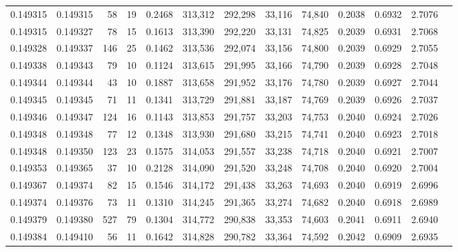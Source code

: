 \begin{tabular}{rrrrrrrrrrrrr}
0.149315 & 0.149315 &    58 &  19 &                                     0.2468 & 313,312 & 292,298 &  33,116 &  74,840 & 0.2038 & 0.6932 & 2.7076 \\
0.149315 & 0.149327 &    78 &  15 &                                     0.1613 & 313,390 & 292,220 &  33,131 &  74,825 & 0.2039 & 0.6931 & 2.7068 \\
0.149328 & 0.149337 &   146 &  25 &                                     0.1462 & 313,536 & 292,074 &  33,156 &  74,800 & 0.2039 & 0.6929 & 2.7055 \\
0.149338 & 0.149343 &    79 &  10 &                                     0.1124 & 313,615 & 291,995 &  33,166 &  74,790 & 0.2039 & 0.6928 & 2.7048 \\
0.149344 & 0.149344 &    43 &  10 &                                     0.1887 & 313,658 & 291,952 &  33,176 &  74,780 & 0.2039 & 0.6927 & 2.7044 \\
0.149345 & 0.149345 &    71 &  11 &                                     0.1341 & 313,729 & 291,881 &  33,187 &  74,769 & 0.2039 & 0.6926 & 2.7037 \\
0.149346 & 0.149347 &   124 &  16 &                                     0.1143 & 313,853 & 291,757 &  33,203 &  74,753 & 0.2040 & 0.6924 & 2.7026 \\
0.149348 & 0.149348 &    77 &  12 &                                     0.1348 & 313,930 & 291,680 &  33,215 &  74,741 & 0.2040 & 0.6923 & 2.7018 \\
0.149348 & 0.149350 &   123 &  23 &                                     0.1575 & 314,053 & 291,557 &  33,238 &  74,718 & 0.2040 & 0.6921 & 2.7007 \\
0.149353 & 0.149365 &    37 &  10 &                                     0.2128 & 314,090 & 291,520 &  33,248 &  74,708 & 0.2040 & 0.6920 & 2.7004 \\
0.149367 & 0.149374 &    82 &  15 &                                     0.1546 & 314,172 & 291,438 &  33,263 &  74,693 & 0.2040 & 0.6919 & 2.6996 \\
0.149374 & 0.149376 &    73 &  11 &                                     0.1310 & 314,245 & 291,365 &  33,274 &  74,682 & 0.2040 & 0.6918 & 2.6989 \\
0.149379 & 0.149380 &   527 &  79 &                                     0.1304 & 314,772 & 290,838 &  33,353 &  74,603 & 0.2041 & 0.6911 & 2.6940 \\
0.149384 & 0.149410 &    56 &  11 &                                     0.1642 & 314,828 & 290,782 &  33,364 &  74,592 & 0.2042 & 0.6909 & 2.6935 \\

\end{tabular}
